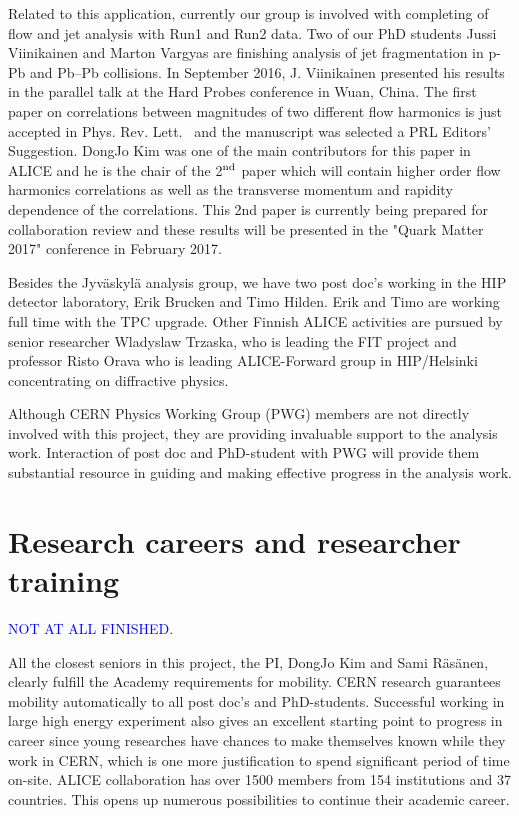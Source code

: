 Related to this application, currently our group is involved with completing of flow and jet analysis with Run1 and Run2 data. Two of our PhD students Jussi Viinikainen and Marton Vargyas are finishing analysis of jet fragmentation in p-Pb and Pb--Pb collisions. In September 2016, J. Viinikainen  presented his results in the parallel talk at the Hard Probes conference in Wuan, China. The first paper on correlations between magnitudes of two different flow harmonics is just accepted in Phys. Rev. Lett.~\cite{ALICE:2016kpq} and the manuscript was selected a PRL Editors' Suggestion. DongJo Kim was one of the main contributors for this paper in ALICE and he is the chair of the 2$^{\rm nd}$ paper which will contain higher order flow harmonics correlations as well as the transverse momentum and rapidity dependence of the correlations. This 2nd paper is currently being prepared for collaboration review and these results will be presented in the "Quark Matter 2017" conference in February 2017. 



Besides the Jyv\"askyl\"a analysis group, we have two post doc's working in the HIP detector laboratory, Erik Brucken and Timo Hilden. Erik and Timo are working full time with the TPC upgrade. Other Finnish ALICE activities are pursued by senior researcher Wladyslaw Trzaska, who is leading the FIT project and professor Risto Orava who is leading ALICE-Forward group in HIP/Helsinki concentrating on diffractive physics.

Although CERN Physics Working Group (PWG) members are not directly involved with this project, they are providing invaluable support to the analysis work. Interaction of post doc and PhD-student with PWG will provide them substantial resource in guiding and making effective progress in the analysis work.

\section{Research careers and researcher training}%
\label{sec:career}

\textcolor{blue}{NOT AT ALL FINISHED.}

All the closest seniors in this project, the PI, DongJo Kim and Sami R\"as\"anen, clearly fulfill the Academy requirements for mobility. CERN research guarantees mobility automatically to all post doc's and PhD-students. Successful working in large high energy experiment also gives an excellent starting point to progress in career since young researches have chances to make themselves known while they work in CERN, which is one more justification to spend significant period of time on-site. ALICE collaboration has over 1500 members from 154 institutions and 37 countries. This opens up numerous possibilities to continue their academic career.


